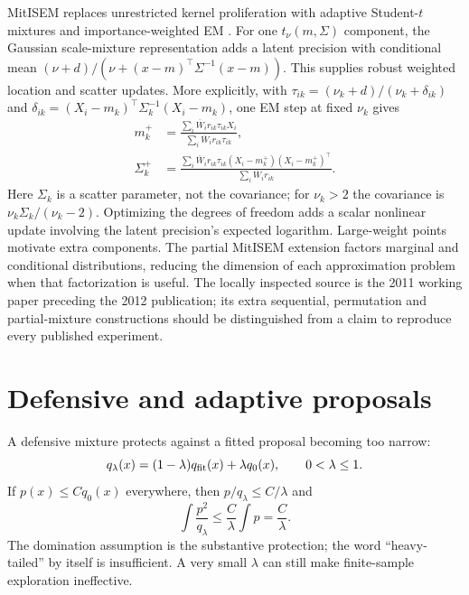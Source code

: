 MitISEM replaces unrestricted kernel proliferation with adaptive Student-$t$
mixtures and importance-weighted EM
\citep[Sections 2 and 5; Appendix A]{hoogerheide2012mitisem}. For one
$t_\nu(m,\Sigma)$ component, the Gaussian scale-mixture representation adds a
latent precision with conditional mean
$(\nu+d)/(\nu+(x-m)^\top\Sigma^{-1}(x-m))$. This supplies robust weighted
location and scatter updates. More explicitly, with
$\tau_{ik}=(\nu_k+d)/(\nu_k+\delta_{ik})$ and
$\delta_{ik}=(X_i-m_k)^\top\Sigma_k^{-1}(X_i-m_k)$, one EM step at fixed
$\nu_k$ gives
\begin{align}
 m_k^+&=\frac{\sum_i\overline W_i r_{ik}\tau_{ik}X_i}
                 {\sum_i\overline W_i r_{ik}\tau_{ik}},\\
 \Sigma_k^+&=\frac{\sum_i\overline W_i r_{ik}\tau_{ik}
          (X_i-m_k^+)(X_i-m_k^+)^\top}{\sum_i\overline W_i r_{ik}}.
 \label{eq:bf-is-student-em}
\end{align}
Here $\Sigma_k$ is a scatter parameter, not the covariance; for $\nu_k>2$ the
covariance is $\nu_k\Sigma_k/(\nu_k-2)$. Optimizing the degrees of freedom adds
a scalar nonlinear update involving the latent precision's expected logarithm.
Large-weight points motivate extra components.
The partial MitISEM extension factors marginal and conditional distributions,
reducing the dimension of each approximation problem when that factorization
is useful. The locally inspected source is the 2011 working paper preceding
the 2012 publication; its extra sequential, permutation and partial-mixture
constructions should be distinguished from a claim to reproduce every published
experiment.

\section{Defensive and adaptive proposals}

A defensive mixture protects against a fitted proposal becoming too narrow:
\begin{equation}
 q_\lambda(x)=(1-\lambda)q_{\rm fit}(x)+\lambda q_0(x),
 \qquad 0<\lambda\le1.
 \label{eq:bf-is-defensive}
\end{equation}
If $p(x)\le Cq_0(x)$ everywhere, then $p/q_\lambda\le C/\lambda$ and
\begin{equation}
 \int\frac{p^2}{q_\lambda}\le\frac{C}{\lambda}\int p
 =\frac{C}{\lambda}.
 \label{eq:bf-is-defensive-bound}
\end{equation}
The domination assumption is the substantive protection; the word
``heavy-tailed'' by itself is insufficient. A very small $\lambda$ can still
make finite-sample exploration ineffective.

